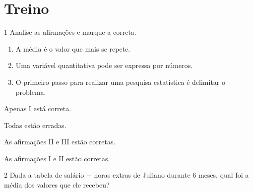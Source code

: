 
\section{Treino}

\num{1} Analise as afirmações e marque a correta.

\begin{enumerate}
\item A média é o valor que mais se repete.

\item Uma variável quantitativa pode ser expressa por números.

\item O primeiro passo para realizar uma pesquisa estatística é
delimitar o problema.
\end{enumerate}

\begin{escolha}
\item Apenas I está correta.
\item Todas estão erradas.
\item As afirmações II e III estão corretas.
\item As afirmações I e II estão corretas.
\end{escolha}



\num{2} Dada a tabela de salário + horas extras de Juliano durante 6 meses,
qual foi a média dos valores que ele recebeu?


